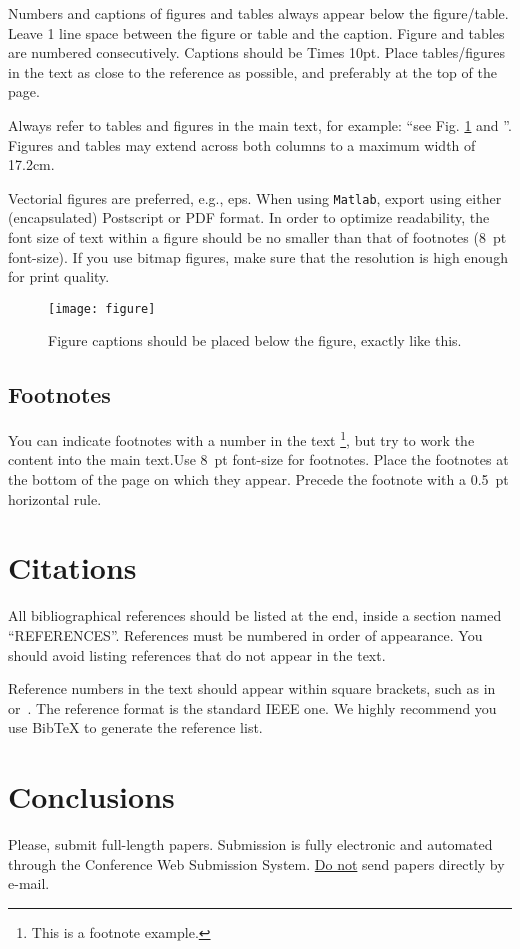 \documentclass{article}
\begin{document}
Numbers and captions of figures and tables always appear below the figure/table.
Leave 1 line space between the figure or table and the caption.
Figure and tables are numbered consecutively. 
Captions should be Times 10pt. Place tables/figures in the text as close to the reference as possible, 
and preferably at the top of the page.

Always refer to tables and figures in the main text, for example: ``see Fig. \ref{fig:example} and ''.
Figures and tables may extend across both columns to a maximum width of 17.2cm.

Vectorial figures are preferred, e.g., eps. When using \texttt{Matlab}, export using either (encapsulated) Postscript or PDF format. In order to optimize readability, the font size of text within a figure should be no smaller than
that of footnotes (8~pt font-size). If you use bitmap figures, make sure that the resolution is high enough for print quality. 

\begin{figure}[t]
\centering
\texttt{[image: figure]}
\caption{Figure captions should be placed below the figure, 
exactly like this.\label{fig:example}}
\end{figure}


\subsection{Footnotes}
You can indicate footnotes with a number in the text \footnote{This is a footnote example.},
but try to work the content into the main text.Use 8~pt font-size for footnotes.  Place the footnotes at the bottom of the page 
on which they appear. Precede the footnote with a 0.5~pt horizontal rule.

\section{Citations}
All bibliographical references should be listed at the end, inside a section named ``REFERENCES''. References must be numbered in order of appearance. You should avoid listing references that do not appear in the text.

Reference numbers in the text should appear within square brackets, such as in~\cite{Someone:00} or~\cite{Someone:00,Someone:04,Someone:09}. The reference format is the standard IEEE one. We highly recommend you use BibTeX 
to generate the reference list.

\section{Conclusions}
Please, submit full-length papers. Submission is fully electronic and automated through the Conference Web Submission System. \underline{Do not} send papers directly by e-mail.
\fi




\end{document}
